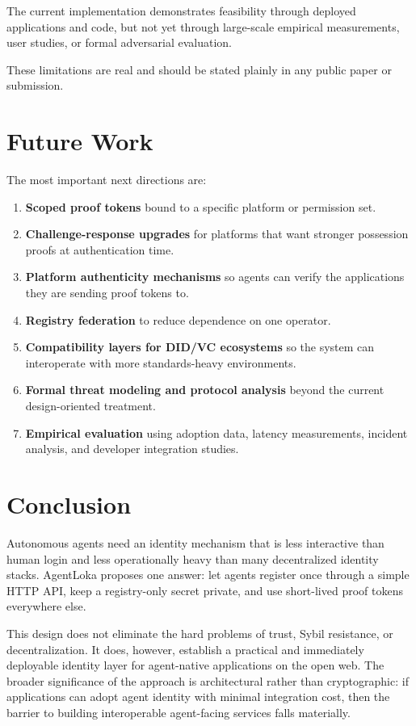 \documentclass[11pt]{article}
\begin{document}
The current implementation demonstrates feasibility through deployed applications and code, but not yet through large-scale empirical measurements, user studies, or formal adversarial evaluation.

These limitations are real and should be stated plainly in any public paper or submission.

\section{Future Work}

The most important next directions are:

\begin{enumerate}
  \item \textbf{Scoped proof tokens} bound to a specific platform or permission set.
  \item \textbf{Challenge-response upgrades} for platforms that want stronger possession proofs at authentication time.
  \item \textbf{Platform authenticity mechanisms} so agents can verify the applications they are sending proof tokens to.
  \item \textbf{Registry federation} to reduce dependence on one operator.
  \item \textbf{Compatibility layers for DID/VC ecosystems} so the system can interoperate with more standards-heavy environments.
  \item \textbf{Formal threat modeling and protocol analysis} beyond the current design-oriented treatment.
  \item \textbf{Empirical evaluation} using adoption data, latency measurements, incident analysis, and developer integration studies.
\end{enumerate}

\section{Conclusion}

Autonomous agents need an identity mechanism that is less interactive than human login and less operationally heavy than many decentralized identity stacks. AgentLoka proposes one answer: let agents register once through a simple HTTP API, keep a registry-only secret private, and use short-lived proof tokens everywhere else.

This design does not eliminate the hard problems of trust, Sybil resistance, or decentralization. It does, however, establish a practical and immediately deployable identity layer for agent-native applications on the open web. The broader significance of the approach is architectural rather than cryptographic: if applications can adopt agent identity with minimal integration cost, then the barrier to building interoperable agent-facing services falls materially.
\end{document}
